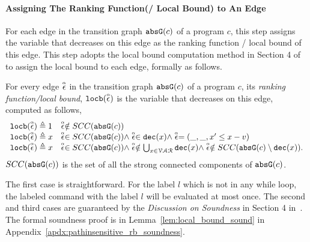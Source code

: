 \paragraph*{Assigning The Ranking Function(/ Local Bound) to An Edge}
For each edge in the transition graph $\mathtt{abs}{\mathtt{G}}(c)$ of a program $c$,
this step assigns the variable that decreases on this edge as the ranking function / local bound of this edge.
This step adopts the local bound computation method in Section 4 of \cite{sinn2017complexity} to assign the local bound to each edge,
formally as follows.
\begin{defn}
  \label{def:ranking_gen}
For every edge $\stackrel{\scriptscriptstyle{\alpha}}{\mathtt{\epsilon}{}}$ in the transition graph $\mathtt{abs}{\mathtt{G}}(c)$ of a program $c$,
its \emph{ranking function/local bound}, $\mathtt{locb}(\stackrel{\scriptscriptstyle{\alpha}}{\mathtt{\epsilon}{}})$
is the variable that decreases on this edge, computed as follows,
%
\[ 
\begin{array}{ll}
  \mathtt{locb}(\stackrel{\scriptscriptstyle{\alpha}}{\mathtt{\epsilon}{}}) \triangleq 1 
  & \stackrel{\scriptscriptstyle{\alpha}}{\mathtt{\epsilon}{}} \notin SCC(\mathtt{abs}{\mathtt{G}}(c))
  \\
  \mathtt{locb}(\stackrel{\scriptscriptstyle{\alpha}}{\mathtt{\epsilon}{}}) \triangleq x
  & \stackrel{\scriptscriptstyle{\alpha}}{\mathtt{\epsilon}{}} \in SCC(\mathtt{abs}{\mathtt{G}}(c)) \land \stackrel{\scriptscriptstyle{\alpha}}{\mathtt{\epsilon}{}} \in \mathtt{dec}(x) \land  \stackrel{\scriptscriptstyle{\alpha}}{\mathtt{\epsilon}{}} = (\_, \_ , x' \leq x - v) \\
  \mathtt{locb}(\stackrel{\scriptscriptstyle{\alpha}}{\mathtt{\epsilon}{}}) \triangleq x
  & \stackrel{\scriptscriptstyle{\alpha}}{\mathtt{\epsilon}{}} \in SCC(\mathtt{abs}{\mathtt{G}}(c)) \land 
  \stackrel{\scriptscriptstyle{\alpha}}{\mathtt{\epsilon}{}}  \notin \bigcup_{x \in \mathcal{VAR}} \mathtt{dec}(x)
  \land \stackrel{\scriptscriptstyle{\alpha}}{\mathtt{\epsilon}{}} \notin SCC(\mathtt{abs}{\mathtt{G}}(c) \setminus \mathtt{dec}(x)).
\end{array}
\]
$SCC(\mathtt{abs}{\mathtt{G}}(c))$ is the set of all the strong connected components of $\mathtt{abs}{\mathtt{G}}(c)$.
\end{defn}
  The first case is straightforward. 
  For the label $l$ which is not in any while loop, 
  the labeled command with the label $l$ will be 
  evaluated at most once. 
  The second and third cases are guaranteed by the \emph{Discussion on Soundness} in Section 4 in~\cite{sinn2017complexity}.
  The formal soundness proof is in Lemma~\ref{lem:local_bound_sound} in Appendix~\ref{apdx:pathinsensitive_rb_soundness}.
%
